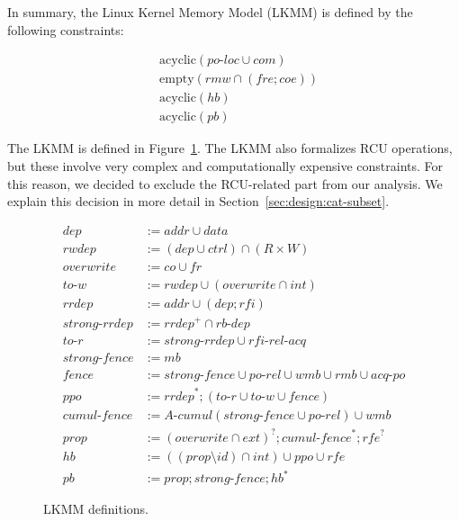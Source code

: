 In summary, the Linux Kernel Memory Model (LKMM) is defined by the following constraints:

\[
\begin{aligned}
&\mathrm{acyclic}(\mathit{po}\text{-}\mathit{loc} \cup \mathit{com}) \\
&\mathrm{empty}(\mathit{rmw} \cap (\mathit{fre} \mathbin{;} \mathit{coe})) \\
&\mathrm{acyclic}(\mathit{hb}) \\
&\mathrm{acyclic}(\mathit{pb})
\end{aligned}
\]

The LKMM is defined in Figure~\ref{fig:lkmm-definitions}. The LKMM also formalizes RCU operations, but these involve very complex and computationally expensive constraints. For this reason, we decided to exclude the RCU-related part from our analysis.
We explain this decision in more detail in Section~\ref{sec:design:cat-subset}.

\begin{figure}[h]
\centering
\begin{align*}
\mathit{dep} &:= \mathit{addr} \cup \mathit{data} \\
\mathit{rwdep} &:= (\mathit{dep} \cup \mathit{ctrl}) \cap (R \times W) \\
\mathit{overwrite} &:= \mathit{co} \cup \mathit{fr} \\
\mathit{to}\text{-}\mathit{w} &:= \mathit{rwdep} \cup (\mathit{overwrite} \cap \mathit{int}) \\
\mathit{rrdep} &:= \mathit{addr} \cup (\mathit{dep} \mathbin{;} \mathit{rfi}) \\
\mathit{strong}\text{-}\mathit{rrdep} &:= \mathit{rrdep}^{+} \cap \mathit{rb}\text{-}\mathit{dep} \\
\mathit{to}\text{-}\mathit{r} &:= \mathit{strong}\text{-}\mathit{rrdep} \cup \mathit{rfi}\text{-}\mathit{rel}\text{-}\mathit{acq} \\
\mathit{strong}\text{-}\mathit{fence} &:= \mathit{mb} \\
\mathit{fence} &:= \mathit{strong}\text{-}\mathit{fence} \cup \mathit{po}\text{-}\mathit{rel} \cup \mathit{wmb} \cup \mathit{rmb} \cup \mathit{acq}\text{-}\mathit{po} \\
\mathit{ppo} &:= \mathit{rrdep}^{*} \mathbin{;} (\mathit{to}\text{-}\mathit{r} \cup \mathit{to}\text{-}\mathit{w} \cup \mathit{fence}) \\
\mathit{cumul}\text{-}\mathit{fence} &:= \mathit{A}\text{-}\mathit{cumul}(\mathit{strong}\text{-}\mathit{fence} \cup \mathit{po}\text{-}\mathit{rel}) \cup \mathit{wmb} \\
\mathit{prop} &:= (\mathit{overwrite} \cap \mathit{ext})^{?} \mathbin{;} \mathit{cumul}\text{-}\mathit{fence}^{*} \mathbin{;} \mathit{rfe}^{?} \\
\mathit{hb} &:= ((\mathit{prop} \setminus \mathit{id}) \cap \mathit{int}) \cup \mathit{ppo} \cup \mathit{rfe} \\
\mathit{pb} &:= \mathit{prop} \mathbin{;} \mathit{strong}\text{-}\mathit{fence} \mathbin{;} \mathit{hb}^{*}
\end{align*}
\caption{LKMM definitions.}
\label{fig:lkmm-definitions}
\end{figure}

